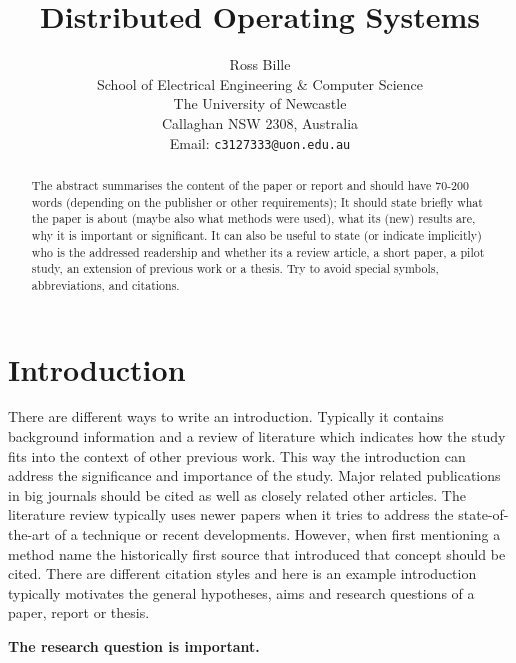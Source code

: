 \documentclass[a4,12pt]{article}
\newenvironment{boxit}{\begin{lrbox}{\savepar}
        \begin{minipage}[b]{4.6in}}
        {\end{minipage}\end{lrbox}\fbox{\usebox{\savepar}}}
\begin{document}
%
\title{\bf Distributed Operating Systems}
%
\author{Ross Bille\\
School of Electrical Engineering \& Computer Science\\
The University of Newcastle\\ Callaghan NSW 2308, Australia\\
Email: \texttt{c3127333@uon.edu.au} } 

\maketitle


\newpage
\begin{abstract}%
\noindent The abstract summarises the content of the paper or report and should have 70-200 words (depending on the publisher or other requirements); It
should state briefly what the paper is about (maybe also what
methods were used), what its (new) results are, why it is
important or significant. It can also be useful to state (or
indicate implicitly) who is the addressed readership and whether
its a review article, a short paper, a pilot study, an
extension of previous work or a thesis. Try to avoid special symbols, abbreviations, and citations.
\end{abstract}

\pagebreak

\tableofcontents

\pagebreak

\section{Introduction}

There are different ways to write an introduction. Typically it
contains background information and a review of literature which
indicates how the study fits into the context of other previous
work. This way the introduction can  address the significance and importance of the study. Major related publications in big journals should be cited
as well as closely related other articles. The literature review typically uses newer papers when it tries to address the state-of-the-art of a technique or recent developments. However, when first mentioning a method name the historically first source that introduced that concept should be cited. There are different citation styles and here is an example introduction
typically motivates the general hypotheses, aims and research questions
of a paper, report or thesis.  

\begin{center}
\begin{boxit}
\textbf{The research question is important.}
\end{boxit}
\end{center}
\end{document}
